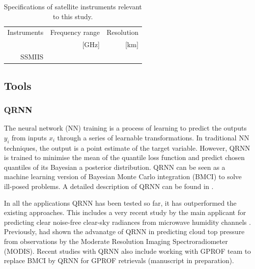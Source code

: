 \documentclass[12pt,oneside,a4paper]{article}
\begin{document}
\begin{table}[t]
	\caption{Specifications of satellite instruments relevant to this study.}
	\label{tab:specifications_instruments}	
	\begin{tabular}{rrr}

		Instruments & Frequency range 	& Resolution  \\
					& [GHz]				& [km]			\\
		\hline			
		SSMIIS		&\\
		\hline			

	\end{tabular}
\end{table}

 
\subsection{Tools}
\subsubsection{QRNN}
%
\label{sec:qrnn}
The neural network (NN) training is a process of learning to predict the outputs {$y_i$} from inputs {$x_i$} through a series of learnable transformations. In traditional NN techniques, the output is a point estimate of the target variable. However, QRNN is trained to minimise the mean of the quantile loss function and predict chosen quantiles of its Bayesian a posterior distribution. QRNN can be seen as a machine learning version of Bayesian Monte Carlo integration (BMCI) to solve ill-posed problems. A detailed description of QRNN can be found in \citet{pfreundschuh:aneur:18}.  

In all the applications QRNN has been tested so far, it has outperformed the existing approaches. This includes a very recent study by the main applicant for predicting clear noise-free clear-sky radiances from microwave humidity channels \citep{kaur:2021:canma}. Previously, \citet{pfreundschuh:aneur:18} had shown the advanatge of QRNN in predicting cloud top pressure from observations by the Moderate Resolution Imaging Spectroradiometer (MODIS). Recent studies with QRNN also include working with GPROF team  to replace BMCI by QRNN for GPROF retrievals (manuscript in preparation).
\end{document}
